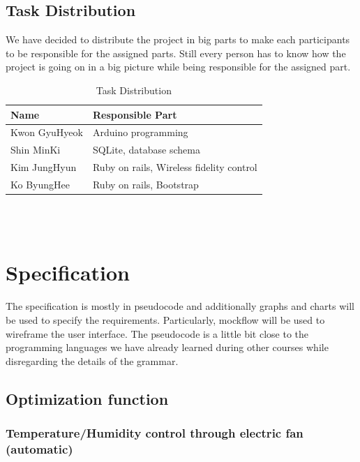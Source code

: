 \documentclass[conference]{IEEEtran}
\begin{document}
\subsection{Task Distribution}
We have decided to distribute the project in big parts to make each participants to be responsible for the assigned parts. Still every person has to know how the project is going on in a big picture while being responsible for the assigned part.
\begin{table}[H]
\renewcommand{\arrayrulewidth}{1pt}
\renewcommand{\arraystretch}{2.5}
\begin{tabular}
{|p{4cm}|p{4cm}|}\hline
Name & Responsible Part\\ \hline
Kwon GyuHyeok&Arduino programming\\ \hline
Shin MinKi&SQLite, database schema\\ \hline
Kim JungHyun&Ruby on rails, Wireless fidelity control\\ \hline
Ko ByungHee&Ruby on rails, Bootstrap\\ \hline
\end{tabular}
\\
\\
\caption{Task Distribution}
\label{tab:template}
\end{table}

\section{Specification}
The specification is mostly in pseudocode and additionally graphs and charts will be used to specify the requirements. Particularly, mockflow will be used to wireframe the user interface. The pseudocode is a little bit close to the programming languages we have already learned during other courses while disregarding the details of the grammar.
\subsection{Optimization function}
\subsubsection{Temperature/Humidity control through electric fan (automatic)}
\end{document}
